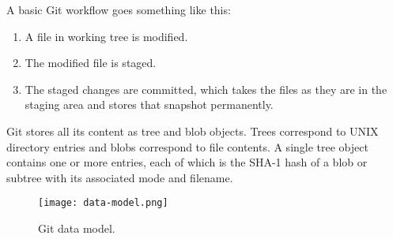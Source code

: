 A basic Git workflow goes something like this:

\begin{enumerate}
  \item A file in working tree is modified.
  \item The modified file is staged.
  \item The staged changes are committed, which takes the files as they are in
  the staging area and stores that snapshot permanently.
\end{enumerate}

Git stores all its content as tree and blob objects. Trees correspond to UNIX
directory entries and blobs correspond to file contents. A single tree object contains
one or more entries, each of which is the SHA-1 hash of a blob or subtree with its
associated mode and filename.

\begin{figure}[H]
\centering
\texttt{[image: data-model.png]}
\caption{Git data model.}
\end{figure}

\newpage
